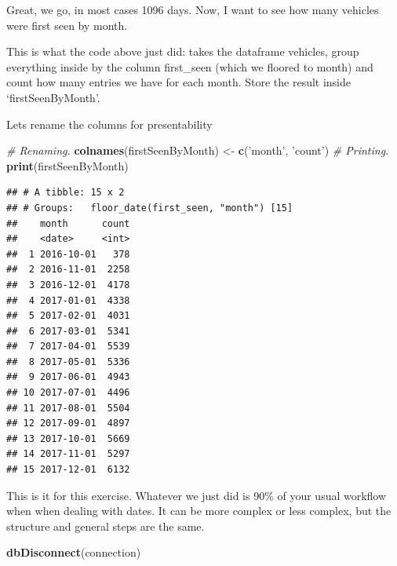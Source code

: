 \documentclass[]{book}
\newenvironment{Shaded}{\begin{snugshade}}{\end{snugshade}}
\newcommand{\CommentTok}[1]{\textcolor[rgb]{0.56,0.35,0.01}{\textit{#1}}}
\newcommand{\KeywordTok}[1]{\textcolor[rgb]{0.13,0.29,0.53}{\textbf{#1}}}
\newcommand{\NormalTok}[1]{#1}
\newcommand{\OperatorTok}[1]{\textcolor[rgb]{0.81,0.36,0.00}{\textbf{#1}}}
\newcommand{\StringTok}[1]{\textcolor[rgb]{0.31,0.60,0.02}{#1}}
\begin{document}
Great, we go, in most cases 1096 days. Now, I want to see how many vehicles were first seen by month.

\begin{Shaded}
\end{Shaded}

This is what the code above just did: takes the dataframe vehicles, group everything inside by the column first\_seen (which we floored to month) and count how many entries we have for each month. Store the result inside `firstSeenByMonth'.

Lets rename the columns for presentability

\begin{Shaded}
\begin{Highlighting}[]
\CommentTok{# Renaming.}
\KeywordTok{colnames}\NormalTok{(firstSeenByMonth) <-}\StringTok{ }\KeywordTok{c}\NormalTok{(}\StringTok{'month'}\NormalTok{, }\StringTok{'count'}\NormalTok{)}
\CommentTok{# Printing.}
\KeywordTok{print}\NormalTok{(firstSeenByMonth)}
\end{Highlighting}
\end{Shaded}

\begin{verbatim}
## # A tibble: 15 x 2
## # Groups:   floor_date(first_seen, "month") [15]
##    month      count
##    <date>     <int>
##  1 2016-10-01   378
##  2 2016-11-01  2258
##  3 2016-12-01  4178
##  4 2017-01-01  4338
##  5 2017-02-01  4031
##  6 2017-03-01  5341
##  7 2017-04-01  5539
##  8 2017-05-01  5336
##  9 2017-06-01  4943
## 10 2017-07-01  4496
## 11 2017-08-01  5504
## 12 2017-09-01  4897
## 13 2017-10-01  5669
## 14 2017-11-01  5297
## 15 2017-12-01  6132
\end{verbatim}

This is it for this exercise. Whatever we just did is 90\% of your usual workflow when when dealing with dates. It can be more complex or less complex, but the structure and general steps are the same.

\begin{Shaded}
\begin{Highlighting}[]
\KeywordTok{dbDisconnect}\NormalTok{(connection)}
\end{Highlighting}
\end{Shaded}
\end{document}
